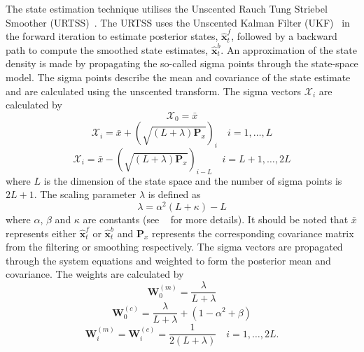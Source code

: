 \documentclass[12pt]{iopart}		%
\begin{document}
The state estimation technique utilises the Unscented Rauch Tung Striebel Smoother (URTSS)~\cite{Sarkka2010}. The URTSS uses the Unscented Kalman Filter (UKF)~\cite{Julier1997} in the forward iteration to estimate posterior states, $\hat{\mathbf x}_t^{f}$, followed by a backward path to compute the smoothed state estimates, $\hat{\mathbf x}_t^{b}$. An approximation of the state density is made by propagating the so-called sigma points through the state-space model. The sigma points describe the mean and covariance of the state estimate and are calculated using the unscented transform. The sigma vectors $\mathcal X_i$ are calculated by
\begin{equation}
 \mathcal X_{0}=\bar x
\end{equation}
\begin{equation}
 \mathcal X_{i}=\bar x+(\sqrt{( L + \lambda)\mathbf P_x})_i \quad i=1, \dots,  L
\end{equation}
\begin{equation}
 \mathcal X_{i}=\bar x-(\sqrt{( L + \lambda)\mathbf P_x})_{i- L} \quad i= L+1, \dots, 2 L
\end{equation}
where $L$ is the dimension of the state space and the number of sigma points is $2L+1$. The scaling parameter $\lambda$ is defined as
\begin{equation}
\lambda=\alpha^2( L+\kappa)- L 
\end{equation}
where $\alpha$, $\beta$ and $\kappa$ are constants (see ~\cite{Haykin2001} for more details). It should be noted that $\bar x$ represents either $\hat{\mathbf x}_t^{f}$ or $\hat{\mathbf x}_t^{b}$ and $\mathbf{P}_x$ represents the corresponding covariance matrix from the filtering or smoothing respectively. The sigma vectors are propagated through the system equations and weighted to form the posterior mean and covariance. The weights are calculated by
\begin{equation}
 \mathbf W_0^{(m)}=\frac{\lambda}{ L+\lambda}
\end{equation}
\begin{equation}
 \mathbf W_0^{(c)}=\frac{\lambda}{ L+\lambda}+(1-\alpha^2+\beta)
\end{equation}
\begin{equation}
 \mathbf W_i^{(m)}=\mathbf W_i^{(c)}=\frac{1}{2( L+\lambda)} \quad i=1, \dots, 2L.
\end{equation}
\end{document}
